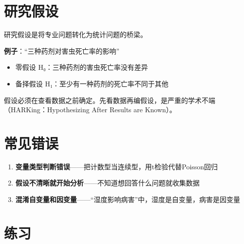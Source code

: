 \documentclass[
  letterpaper,
]{scrbook}
\providecommand{\tightlist}{%
  \setlength{\itemsep}{0pt}\setlength{\parskip}{0pt}}
\begin{document}
\section{研究假设}\label{ux7814ux7a76ux5047ux8bbe}

研究假设是将专业问题转化为统计问题的桥梁。

\textbf{例子}：``三种药剂对害虫死亡率的影响''

\begin{itemize}
\tightlist
\item
  零假设 H₀：三种药剂的害虫死亡率没有差异
\item
  备择假设 H₁：至少有一种药剂的死亡率不同于其他
\end{itemize}

\begin{tcolorbox}[enhanced jigsaw, arc=.35mm, bottomrule=.15mm, bottomtitle=1mm, breakable, colback=white, colbacktitle=quarto-callout-important-color!10!white, colframe=quarto-callout-important-color-frame, coltitle=black, left=2mm, leftrule=.75mm, opacityback=0, opacitybacktitle=0.6, rightrule=.15mm, title=\textcolor{quarto-callout-important-color}{\faExclamation}\hspace{0.5em}{牢记}, titlerule=0mm, toprule=.15mm, toptitle=1mm]

假设必须在查看数据之前确定。先看数据再编假设，是严重的学术不端（HARKing：Hypothesizing
After Results are Known）。

\end{tcolorbox}

\section{常见错误}\label{ux5e38ux89c1ux9519ux8bef}

\begin{enumerate}
\def\labelenumi{\arabic{enumi}.}
\tightlist
\item
  \textbf{变量类型判断错误}------把计数型当连续型，用t检验代替Poisson回归
\item
  \textbf{假设不清晰就开始分析}------不知道想回答什么问题就收集数据
\item
  \textbf{混淆自变量和因变量}------``湿度影响病害''中，湿度是自变量，病害是因变量
\end{enumerate}

\section{练习}\label{ux7ec3ux4e60-1}
\end{document}
